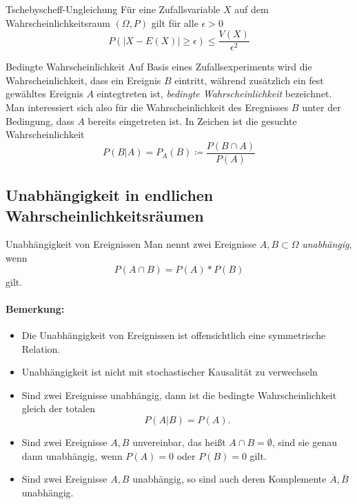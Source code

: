\begin{satz}{Tschebyscheff-Ungleichung}\label{tschebyscheff}
	Für eine Zufallsvariable $X$ auf dem Wahrscheinlichkeitsraum $(\Omega,P)$ gilt für alle $\epsilon>0$
	\begin{equation*}
		P(|X-E(X)|\geq \epsilon)\leq \frac{V(X)}{\epsilon^2}
	\end{equation*}
	
\end{satz}

\begin{definition}{Bedingte Wahrscheinlichkeit}
	Auf Basis eines Zufallsexperiments wird die Wahrscheinlichkeit, dass ein Ereignis $B$ eintritt, während zusätzlich ein fest gewähltes Ereignis $A$ eintegtreten ist, \emph{bedingte Wahrscheinlichkeit} bezeichnet. Man interessiert sich also für die Wahrscheinlichkeit des Eregnisses $B$ unter der Bedingung, dass $A$ bereits eingetreten ist. In Zeichen ist die gesuchte Wahrscheinlichkeit
	\begin{equation*}
		P(B|A)=P_A(B)\coloneqq\frac{P(B\cap A)}{P(A)}
	\end{equation*}
\end{definition}

\subsection{Unabhängigkeit in endlichen Wahrscheinlichkeitsräumen}
\begin{definition}{Unabhängigkeit von Ereignissen}
	Man nennt zwei Ereignisse $A,B\subset \Omega$ \emph{unabhängig}, wenn
	\begin{equation*}
		P(A\cap B)=P(A)*P(B)
	\end{equation*}
	gilt.
\end{definition}
\paragraph{Bemerkung:}
\begin{itemize}
	\item Die Unabhängigkeit von Ereignissen ist offensichtlich eine symmetrische Relation.
	\item Unabhängigkeit ist nicht mit stochastischer Kausalität zu verwechseln
	\item Sind zwei Ereignisse unabhängig, dann ist die bedingte Wahrscheinlichkeit gleich der totalen
	\begin{equation*}
		P(A|B)=P(A).
	\end{equation*}
	\item Sind zwei Ereignisse $A,B$ unvereinbar, das heißt $A\cap B=\emptyset$, sind sie genau dann unabhängig, wenn $P(A)=0$ oder $P(B)=0$ gilt.
	\item Sind zwei Ereignisse $A,B$ unabhängig, so sind auch deren Komplemente $\overline A, \overline B$ unabhängig.
\end{itemize}


